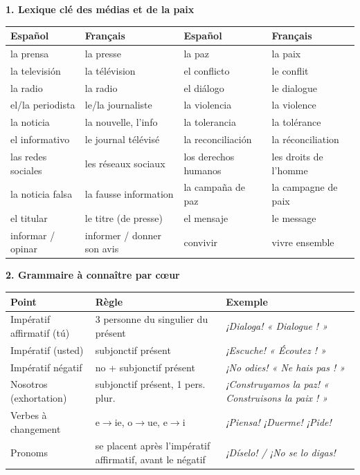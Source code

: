 \documentclass[11pt]{article}
\newcommand{\esp}[1]{\ifmmode\text{\textit{#1}}\else\begingroup\selectlanguage{spanish}\itshape #1\endgroup\fi}
\begin{document}
\begin{bilan}
\textbf{1. Lexique clé des médias et de la paix}

\begin{center}
\begin{tabularx}{\linewidth}{|X|X|X|X|}\hline
\rowcolor{popblueL} Español & Français & Español & Français \\ \hline
la prensa & la presse & la paz & la paix \\ \hline
la televisión & la télévision & el conflicto & le conflit \\ \hline
la radio & la radio & el diálogo & le dialogue \\ \hline
el/la periodista & le/la journaliste & la violencia & la violence \\ \hline
la noticia & la nouvelle, l'info & la tolerancia & la tolérance \\ \hline
el informativo & le journal télévisé & la reconciliación & la réconciliation \\ \hline
las redes sociales & les réseaux sociaux & los derechos humanos & les droits de l'homme \\ \hline
la noticia falsa & la fausse information & la campaña de paz & la campagne de paix \\ \hline
el titular & le titre (de presse) & el mensaje & le message \\ \hline
informar / opinar & informer / donner son avis & convivir & vivre ensemble \\ \hline
\end{tabularx}
\end{center}

\textbf{2. Grammaire à connaître par cœur}

\begin{center}
\begin{tabularx}{\linewidth}{|l|X|X|}\hline
\rowcolor{popblueL} Point & Règle & Exemple \\ \hline
Impératif affirmatif (tú) & 3\up{e} personne du singulier du présent & \esp{¡Dialoga!} « Dialogue ! » \\ \hline
Impératif (usted) & subjonctif présent & \esp{¡Escuche!} « Écoutez ! » \\ \hline
Impératif négatif & no + subjonctif présent & \esp{¡No odies!} « Ne hais pas ! » \\ \hline
Nosotros (exhortation) & subjonctif présent, 1\up{re} pers. plur. & \esp{¡Construyamos la paz!} « Construisons la paix ! » \\ \hline
Verbes à changement & e$\rightarrow$ie, o$\rightarrow$ue, e$\rightarrow$i & \esp{¡Piensa! ¡Duerme! ¡Pide!} \\ \hline
Pronoms & se placent après l'impératif affirmatif, avant le négatif & \esp{¡Díselo! / ¡No se lo digas!} \\ \hline
\end{tabularx}
\end{center}


\end{bilan}
\end{document}
